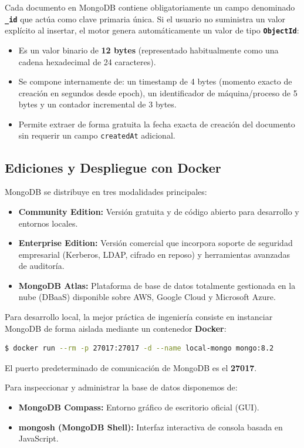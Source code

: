 Cada documento en MongoDB contiene obligatoriamente un campo denominado \textbf{\texttt{\_id}} que actúa como clave primaria única. Si el usuario no suministra un valor explícito al insertar, el motor genera automáticamente un valor de tipo \textbf{\texttt{ObjectId}}:
\begin{itemize}
    \item Es un valor binario de \textbf{12 bytes} (representado habitualmente como una cadena hexadecimal de 24 caracteres).
    \item Se compone internamente de: un timestamp de 4 bytes (momento exacto de creación en segundos desde epoch), un identificador de máquina/proceso de 5 bytes y un contador incremental de 3 bytes.
    \item Permite extraer de forma gratuita la fecha exacta de creación del documento sin requerir un campo \texttt{createdAt} adicional.
\end{itemize}

\subsection{Ediciones y Despliegue con Docker}

MongoDB se distribuye en tres modalidades principales:
\begin{itemize}
    \item \textbf{Community Edition:} Versión gratuita y de código abierto para desarrollo y entornos locales.
    \item \textbf{Enterprise Edition:} Versión comercial que incorpora soporte de seguridad empresarial (Kerberos, LDAP, cifrado en reposo) y herramientas avanzadas de auditoría.
    \item \textbf{MongoDB Atlas:} Plataforma de base de datos totalmente gestionada en la nube (DBaaS) disponible sobre AWS, Google Cloud y Microsoft Azure.
\end{itemize}

Para desarrollo local, la mejor práctica de ingeniería consiste en instanciar MongoDB de forma aislada mediante un contenedor \textbf{Docker}:
\begin{lstlisting}[language=bash]
$ docker run --rm -p 27017:27017 -d --name local-mongo mongo:8.2
\end{lstlisting}
El puerto predeterminado de comunicación de MongoDB es el \textbf{27017}.

Para inspeccionar y administrar la base de datos disponemos de:
\begin{itemize}
    \item \textbf{MongoDB Compass:} Entorno gráfico de escritorio oficial (GUI).
    \item \textbf{mongosh (MongoDB Shell):} Interfaz interactiva de consola basada en JavaScript.
\end{itemize}

